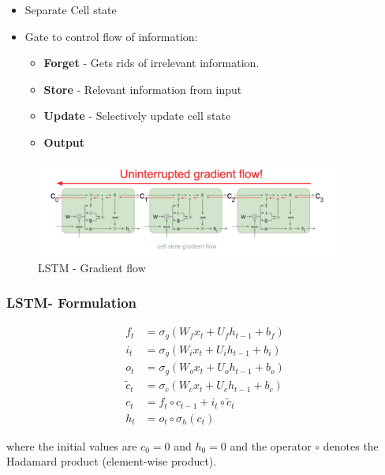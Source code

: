 \documentclass[12pt]{report}
\begin{document}
\begin{itemize}
	\item Separate Cell state
	\item Gate to control flow of information:
	\begin{itemize}
		\item \textbf{Forget} - Gets rids of irrelevant information.
		\item \textbf{Store} - Relevant information from input
		\item \textbf{Update} - Selectively update cell state
		\item \textbf{Output}
	\end{itemize}
\end{itemize}


\begin{figure}[H]\centering\includegraphics[width=10cm]{LSTM_GRADIENT_FLOW.png}\caption{LSTM - Gradient flow}\end{figure}


\subsubsection{LSTM- Formulation}
\begin{align*}
	f_t &= \sigma_g(W_{f} x_t + U_{f} h_{t-1} + b_f) \\
	i_t &= \sigma_g(W_{i} x_t + U_{i} h_{t-1} + b_i) \\
	o_t &= \sigma_g(W_{o} x_t + U_{o} h_{t-1} + b_o) \\
	\tilde{c}_t &= \sigma_c(W_{c} x_t + U_{c} h_{t-1} + b_c) \\
	c_t &= f_t \circ c_{t-1} + i_t \circ \tilde{c}_t \\
	h_t &= o_t \circ \sigma_h(c_t)
\end{align*}

where the initial values are $c_0 = 0$ and $h_0 = 0$ and the operator $\circ$ denotes the Hadamard product (element-wise product). 
\end{document}
